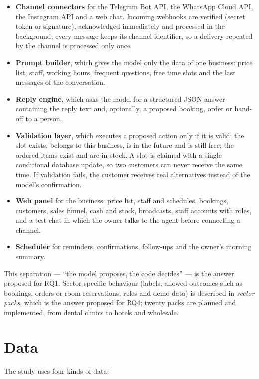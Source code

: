 \begin{itemize}
	\item \textbf{Channel connectors} for the Telegram Bot API, the WhatsApp Cloud API, the Instagram API and a web chat.
	Incoming webhooks are verified (secret token or signature), acknowledged immediately and processed in the background;
	every message keeps its channel identifier, so a delivery repeated by the channel is processed only once.
	\item \textbf{Prompt builder}, which gives the model only the data of one business: price list, staff, working hours,
	frequent questions, free time slots and the last messages of the conversation.
	\item \textbf{Reply engine}, which asks the model for a structured JSON answer containing the reply text and,
	optionally, a proposed booking, order or hand-off to a person.
	\item \textbf{Validation layer}, which executes a proposed action only if it is valid: the slot exists, belongs to
	this business, is in the future and is still free; the ordered items exist and are in stock. A slot is claimed with a
	single conditional database update, so two customers can never receive the same time. If validation fails, the
	customer receives real alternatives instead of the model's confirmation.
	\item \textbf{Web panel} for the business: price list, staff and schedules, bookings, customers, sales funnel, cash
	and stock, broadcasts, staff accounts with roles, and a test chat in which the owner talks to the agent before
	connecting a channel.
	\item \textbf{Scheduler} for reminders, confirmations, follow-ups and the owner's morning summary.
\end{itemize}

This separation --- \enquote{the model proposes, the code decides} --- is the answer proposed for RQ1. Sector-specific
behaviour (labels, allowed outcomes such as bookings, orders or room reservations, rules and demo data) is described in
\emph{sector packs}, which is the answer proposed for RQ4; twenty packs are planned and implemented, from dental clinics to
hotels and wholesale.

\section{Data}

The study uses four kinds of data:


